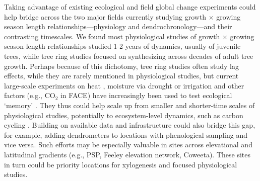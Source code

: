 \documentclass[11pt]{article}
\begin{document}
Taking advantage of existing ecological and field global change experiments could help bridge across the two major fields currently studying growth $\times$ growing season length relationships---physiology and dendrochronology---and their contrasting timescales. We found most physiological studies of growth $\times$ growing season length relationships studied 1-2 years of dynamics, usually of juvenile trees, while tree ring studies focused on synthesizing across decades of adult tree growth. Perhaps because of this dichotomy, tree ring studies often study lag effects, while they are rarely mentioned in physiological studies, but current large-scale experiments on heat \citep[e.g., SPRUCE,][]{hanson2017attaining}, moisture via drought or irrigation \citep[e.g., DroughtNet, Phynwald][]{smith2016drought} and other factors (e.g., $\text{CO}_2$ in FACE) have increasingly been used to test ecological `memory' \citep[e.g., ][]{flinker2021promise, schweiger2022transgenerational}. They thus could help scale up from smaller and shorter-time scales of physiological studies, potentially to ecosystem-level dynamics, such as carbon cycling \citep{ding2021plant, jensen2019simulated}. Building on available data and infrastructure could also bridge this gap, for example, adding dendrometers to locations with phenological sampling and vice versa. Such efforts may be especially valuable in sites across elevational and latitudinal gradients (e.g., PSP, Feeley elevation network, Coweeta). These sites in turn could be priority locations for xylogenesis and focused physiological studies. 

\end{document}
